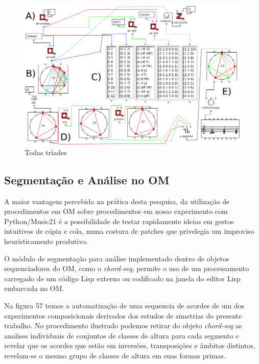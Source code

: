 \documentclass[
	12pt,				%
	openright,			%
	twoside,			%
	a4paper,			%
	english,			%
	french,				%
	spanish,			%
	brazil				%
	]{abntex2}
\begin{document}
\begin{figure}[!h]
	\caption{\label{fig_grafico}Todas tríades }
	\begin{center}
	    \includegraphics[scale=0.5]{OM_settheory/todas_triades.png}
	\end{center}
\end{figure}

\pagebreak
\subsection{Segmentação e Análise no OM}

A maior vantagem percebida na prática desta pesquisa, da utilização de procedimentos em OM sobre procedimentos em nosso experimento com Python/Music21 é a possibilidade de testar rapidamente ideias em gestos intuitivos de cópia e cola, numa costura de patches que privelegia um improviso heuristicamente produtivo. 

O módulo de segmentação para análise implementado dentro de objetos sequenciadores do OM, como o \textit{chord-seq}, permite o uso de um processamento carregado de um código Lisp externo ou codificado na janela do editor Lisp embarcada no OM. 

Na figura 57 temos a automatização de uma sequencia de acordes de um dos experimentos composicionais derivados dos estudos de simetrias do presente trabalho. No procedimento ilustrado podemos retirar do objeto \textit{chord-seq} as analises individuais de conjuntos de classes de altura para cada segmento e revelar que os acordes que estão em inversões, transposições e âmbitos distintos, revelam-se o mesmo grupo de classes de altura em suas formas primas.
\end{document}
